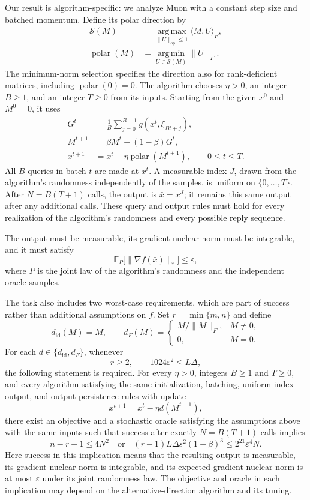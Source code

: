\documentclass[10pt]{article}
\theoremstyle{definition}
\begin{document}
Our result is algorithm-specific: we analyze Muon with a constant step size and batched momentum. Define its polar direction by
\[
\begin{aligned}
\mathcal{S}(M)
&=\operatorname*{arg\,max}_{\|U\|_{\mathrm{op}}\leq1}
       \langle M,U\rangle_F,\\
\operatorname{polar}(M)
&=\operatorname*{arg\,min}_{U\in\mathcal{S}(M)}\|U\|_F.
\end{aligned}
\]
The minimum-norm selection specifies the direction also for rank-deficient matrices, including $\operatorname{polar}(0)=0$. The algorithm chooses $\eta>0$, an integer $B\geq1$, and an integer $T\geq0$ from its inputs. Starting from the given $x^0$ and $M^0=0$, it uses
\[
\begin{aligned}
G^t&=\frac{1}{B}\sum_{j=0}^{B-1}g(x^t,\xi_{Bt+j}),\\
M^{t+1}&=\beta M^t+(1-\beta)G^t,\\
x^{t+1}&=x^t-\eta\operatorname{polar}(M^{t+1}),
\qquad 0\leq t\leq T.
\end{aligned}
\]
All $B$ queries in batch $t$ are made at $x^t$. A measurable index $J$, drawn from the algorithm's randomness independently of the samples, is uniform on $\{0,\ldots,T\}$. After $N=B(T+1)$ calls, the output is $\bar{x}=x^J$; it remains this same output after any additional calls. These query and output rules must hold for every realization of the algorithm's randomness and every possible reply sequence.

The output must be measurable, its gradient nuclear norm must be integrable, and it must satisfy
\[
\mathbb{E}_{P}\bigl[\|\nabla f(\bar{x})\|_*\bigr]
\leq\varepsilon,
\]
where $P$ is the joint law of the algorithm's randomness and the independent oracle samples.

The task also includes two worst-case requirements, which are part of success rather than additional assumptions on $f$. Set $r=\min\{m,n\}$ and define
\[
d_{\mathrm{id}}(M)=M,\qquad
 d_F(M)=
 \begin{cases}
 M/\|M\|_F,&M\ne0,\\
 0,&M=0.
 \end{cases}
\]
For each $d\in\{d_{\mathrm{id}},d_F\}$, whenever
\[
r\geq2,\qquad 1024\varepsilon^2\leq L\Delta,
\]
the following statement is required. For every $\eta>0$, integers $B\geq1$ and $T\geq0$, and every algorithm satisfying the same initialization, batching, uniform-index output, and output persistence rules with update
\[
x^{t+1}=x^t-\eta d(M^{t+1}),
\]
there exist an objective and a stochastic oracle satisfying the assumptions above with the same inputs such that success after exactly $N=B(T+1)$ calls implies
\[
 n-r+1\leq4N^2
 \quad\text{or}\quad
 (r-1)L\Delta s^2(1-\beta)^3
 \leq2^{21}\varepsilon^4N.
\]
Here success in this implication means that the resulting output is measurable, its gradient nuclear norm is integrable, and its expected gradient nuclear norm is at most $\varepsilon$ under its joint randomness law. The objective and oracle in each implication may depend on the alternative-direction algorithm and its tuning.
\end{document}
